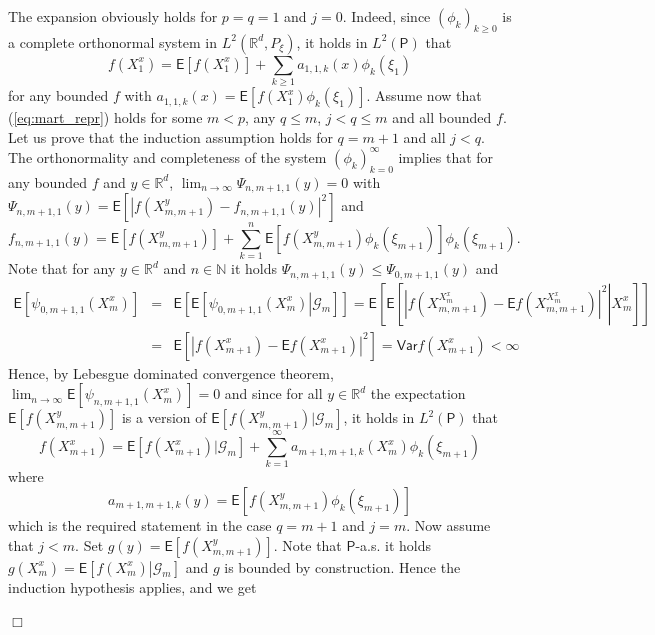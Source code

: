 \documentclass[bj]{imsart}
\def\PE{\mathsf{E}}
\def\PVar{\mathsf{Var}}
\def\nset{\mathbb{N}}
\def\rset{\mathbb{R}}
\def\rset{\mathbb{R}}
\newcommand{\proofendsign}{$\Box$}
\newenvironment{proof}{{\noindent \bf Proof }}
 {{\hspace*{\fill}\proofendsign\par\bigskip}}
\begin{document}
\begin{proof}%
The expansion obviously holds for $p = q=1$ and $j=0$.
Indeed, since $\left(\phi_{k}\right)_{k \geq 0}$ is a complete orthonormal system in \(L^2(\mathbb{R}^d, P_{\xi})\), it holds in \(L^2(\mathsf{P})\) that
\[
f(X^x_{1})=\PE[f(X^x_{1})]+\sum_{k\geq1}a_{1,1,k}(x)\phi_{k}(\xi_{1})
\]
for any bounded $f$ with $a_{1,1,k}(x)=\PE[f(X_{1}^x)\phi_{k}(\xi_{1})]$.
Assume now that (\ref{eq:mart_repr}) holds for some $m < p$, any $q \leq m$, $j < q \leq m$ and all bounded $f$. Let us prove that the induction assumption holds for $q=m+1$ and all $j < q$.
The orthonormality and completeness
of the system $\left(\phi_{k}\right)_{k=0}^\infty$ implies that for any bounded $f$ and $y \in \rset^d$, 
$\lim_{n \rightarrow \infty}\Psi_{n,m+1,1}(y)= 0$ with $\Psi_{n,m+1,1}(y)= \PE[|f(X^y_{m,m+1}) - f_{n,m+1,1}(y)|^2]$ and
\[
f_{n,m+1,1}(y) = \PE[f(X^y_{m,m+1})] +  \sum\limits_{k=1}^{n}\PE[f(X^y_{m,m+1})\phi_{k}(\xi_{m+1})]\phi_k(\xi_{m+1}).
\]
Note that  for any $y \in \rset^d$ and $n \in \nset$ it holds $\Psi_{n,m+1,1}(y) \leq \Psi_{0,m+1,1}(y)$ and
\begin{eqnarray*}
\PE \left[ \psi_{0,m+1,1}(X_m^x) \right] &=& \PE \left[ \left. \PE \left[ \psi_{0,m+1,1}(X_m^x) \right| \mathcal{G}_m\right]\right] = \PE \left[ \left. \PE \left[ |f(X^{X_m^x}_{m,m+1}) - \PE f(X^{X_m^x}_{m,m+1})|^2 \right| X_m^x\right]\right]
\\
&=& \PE \left[ |f(X_{m+1}^x) - \PE f(X_{m+1}^x)|^2 \right] = \PVar{f(X_{m+1}^x)} < \infty
\end{eqnarray*}
Hence, by Lebesgue dominated convergence theorem, $\lim_{n \rightarrow \infty}\PE \left[\psi_{n,m+1,1}(X_m^x)\right] = 0$ and since for all $y \in \rset^d$ the expectation $\PE[f(X^y_{m,m+1})]$ is a version of $\PE \left[f(X^y_{m,m+1}) | \mathcal{G}_m \right]$, it holds in \(L^2(\mathsf{P})\) that
\begin{equation}
\label{eq:1-step-decomp}
f(X^x_{m+1}) = \PE[f(X^x_{m+1})|\mathcal{G}_m] + \sum\limits_{k=1}^{\infty}a_{m+1,m+1,k}(X^x_{m})\phi_{k}(\xi_{m+1})
\end{equation}
where
\[
a_{m+1,m+1,k}(y) = \PE \left[f(X^y_{m,m+1})\phi_k\left(\xi_{m+1}\right)\right]
\]
which is the required statement in the case $q = m+1$ and $j=m$.
Now assume that $j<m$.
Set $g(y) = \PE \left[f(X_{m,m+1}^y)\right]$. Note that $\mathsf{P}$-a.s. it holds $g(X_m^x) = \PE\left[\left.f(X_m^x) \right| \mathcal{G}_m\right]$ and $g$ is bounded by construction. Hence the induction hypothesis applies, and we get
\begin{equation}\label{eq:28082017a1}

\end{equation}
\end{proof}
\end{document}
